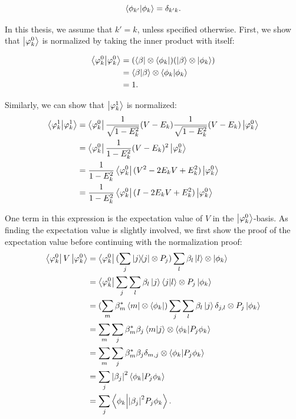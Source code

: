 \begin{equation}
	\braket{\phi_{k'}}{\phi_k} = \delta_{k'k}.
\end{equation}

In this thesis, we assume that $ k' = k$, unless specified otherwise. First, we show that $\left\vert{\varphi_k^0}\right\rangle$ is normalized by taking the inner product with itself:

\begin{align} \begin{split}
\braket{\varphi_k^0}{\varphi_k^0}  &= (\left\langle{\beta}\right\vert \otimes \left\langle{\phi_k}\right\vert)(\left\vert{\beta}\right\rangle \otimes \left\vert{\phi_k}\right\rangle)\\
&= \braket{\beta}{\beta} \otimes \braket{\phi_k}{\phi_k}\\
&= 1.
\end{split} \end{align}

Similarly, we can show that $\left\vert{\varphi_k^1}\right\rangle$ is normalized:
\begin{align} \begin{split}
\braket{\varphi_k^1}{\varphi_k^1}  &= \left\langle{\varphi_k^0}\right\vert \frac{1}{\sqrt{1 - E^2_k}}(V-E_k) \frac{1}{\sqrt{1 - E^2_k}}(V-E_k) \left\vert{\varphi_k^0}\right\rangle\\
&= \left\langle{\varphi_k^0}\right\vert \frac{1}{1 - E^2_k} (V-E_k)^2  \left\vert{\varphi_k^0}\right\rangle\\
&= \frac{1}{1 - E^2_k} \left\langle{\varphi_k^0}\right\vert (V^2 - 2 E_kV + E_k^2) \left\vert{\varphi_k^0}\right\rangle\\
&= \frac{1}{1 - E^2_k} \left\langle{\varphi_k^0}\right\vert (I - 2 E_kV + E_k^2) \left\vert{\varphi_k^0}\right\rangle\\
\end{split} \end{align}

One term in this expression is the expectation value of $V$ in the $\left\vert{\varphi_k^0}\right\rangle$-basis. As finding the expectation value is slightly involved, we first show the proof of the expectation value before continuing with the normalization proof:
\begin{align} \begin{split}
\left\langle{\varphi_k^0}\right\vert V \left\vert{\varphi_k^0}\right\rangle &= \left\langle{\varphi_k^0}\right\vert (\sum_j | j \rangle\!\langle j | \otimes P_j) \sum_l \beta_l \left\vert{l}\right\rangle \otimes \left\vert{\phi_k}\right\rangle\\
&= \left\langle{\varphi_k^0}\right\vert\sum_j \sum_l \beta_l \left\vert{j}\right\rangle \braket{j}{l} \otimes P_j \left\vert{\phi_k}\right\rangle\\
&=(\sum_m \beta_m^* \left\langle{m}\right\vert \otimes \left\langle{\phi_k}\right\vert) \sum_j \sum_l \beta_l \left\vert{j}\right\rangle \delta_{j,l} \otimes P_j \left\vert{\phi_k}\right\rangle\\
&= \sum_m \sum_j \beta_m^* \beta_j \braket{m}{j} \otimes \braket{\phi_k}{P_j \phi_k}\\
&= \sum_m \sum_j \beta_m^* \beta_j \delta_{m,j} \otimes \braket{\phi_k}{P_j \phi_k}\\
&= \sum_j \abs{\beta_j}^2 \braket{\phi_k}{P_j \phi_k}\\
&= \sum_j \braket{\phi_k}{\abs{\beta_j}^2 P_j \phi_k}.
\end{split} \end{align}

